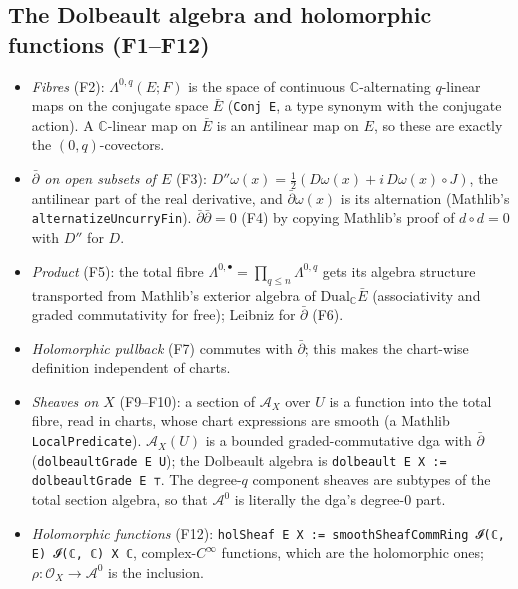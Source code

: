 \documentclass[11pt,a4paper]{article}
\newcommand{\code}[1]{\texttt{#1}}
\newcommand{\cA}{\mathcal{A}}
\newcommand{\Ocal}{\mathcal{O}}
\newcommand{\dbar}{\bar\partial}
\begin{document}
\subsection{The Dolbeault algebra and holomorphic functions (F1--F12)}
\begin{itemize}
\item \emph{Fibres} (F2): $\Lambda^{0,q}(E;F)$ is the space of continuous $\mathbb C$-alternating
$q$-linear maps on the conjugate space $\bar E$ (\code{Conj E}, a type synonym with the conjugate
action). A $\mathbb C$-linear map on $\bar E$ is an antilinear map on $E$, so these are exactly
the $(0,q)$-covectors.
\item \emph{$\dbar$ on open subsets of $E$} (F3): $D''\omega(x)=\tfrac12(D\omega(x)+i\,D\omega(x)\circ J)$,
the antilinear part of the real derivative, and $\dbar\omega(x)$ is its alternation (Mathlib's
\code{alternatizeUncurryFin}). $\dbar\dbar=0$ (F4) by copying Mathlib's proof of $d\circ d=0$
with $D''$ for $D$.
\item \emph{Product} (F5): the total fibre $\Lambda^{0,\bullet}=\prod_{q\le n}\Lambda^{0,q}$ gets
its algebra structure transported from Mathlib's exterior algebra of $\mathrm{Dual}_{\mathbb C}\bar
E$ (associativity and graded commutativity for free); Leibniz for $\dbar$ (F6).
\item \emph{Holomorphic pullback} (F7) commutes with $\dbar$; this makes the chart-wise definition
independent of charts.
\item \emph{Sheaves on $X$} (F9--F10): a section of $\cA_X$ over $U$ is a function into the total
fibre, read in charts, whose chart expressions are smooth (a Mathlib \code{LocalPredicate}).
$\cA_X(U)$ is a bounded graded-commutative dga with $\dbar$ (\code{dolbeaultGrade E U}); the
Dolbeault algebra is \code{dolbeault E X := dolbeaultGrade E ⊤}. The degree-$q$ component sheaves
are subtypes of the total section algebra, so that $\cA^0$ is literally the dga's degree-0 part.
\item \emph{Holomorphic functions} (F12): \code{holSheaf E X := smoothSheafCommRing 𝓘(ℂ, E) 𝓘(ℂ, ℂ) X ℂ},
complex-$C^\infty$ functions, which are the holomorphic ones; $\rho\colon\Ocal_X\to\cA^0$ is the
inclusion.
\end{itemize}
\end{document}
